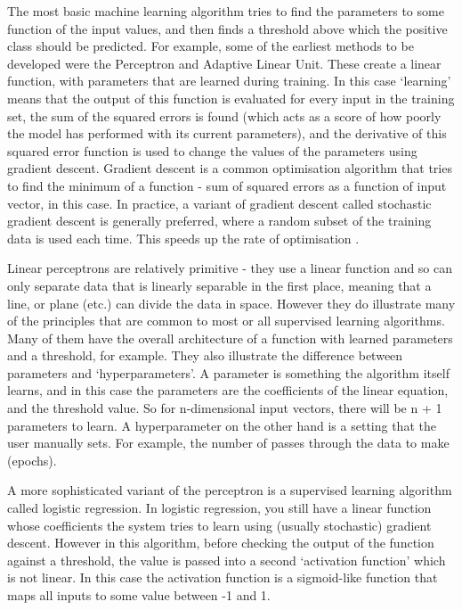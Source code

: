 The most basic machine learning algorithm tries to find the parameters to some function of the input values, and then finds a threshold above which the positive class should be predicted. For example, some of the earliest methods to be developed were the Perceptron and Adaptive Linear Unit. These create a linear function, with parameters that are learned during training. In this case `learning' means that the output of this function is evaluated for every input in the training set, the sum of the squared errors is found (which acts as a score of how poorly the model has performed with its current parameters), and the derivative of this squared error function is used to change the values of the parameters using gradient descent. Gradient descent is a common optimisation algorithm that tries to find the minimum of a function - sum of squared errors as a function of input vector, in this case. In practice, a variant of gradient descent called stochastic gradient descent is generally preferred, where a random subset of the training data is used each time. This speeds up the rate of optimisation .

Linear perceptrons are relatively primitive - they use a linear function and so can only separate data that is linearly separable in the first place, meaning that a line, or plane (etc.) can divide the data in space. However they do illustrate many of the principles that are common to most or all supervised learning algorithms. Many of them have the overall architecture of a function with learned parameters and a threshold, for example. They also illustrate the difference between parameters and `hyperparameters'. A parameter is something the algorithm itself learns, and in this case the parameters are the coefficients of the linear equation, and the threshold value. So for n-dimensional input vectors, there will be n + 1 parameters to learn. A hyperparameter on the other hand is a setting that the user manually sets. For example, the number of passes through the data to make (epochs).

A more sophisticated variant of the perceptron is a supervised learning algorithm called logistic regression. In logistic regression, you still have a linear function whose coefficients the system tries to learn using (usually stochastic) gradient descent. However in this algorithm, before checking the output of the function against a threshold, the value is passed into a second `activation function' which is not linear. In this case the activation function is a sigmoid-like function that maps all inputs to some value between -1 and 1.

